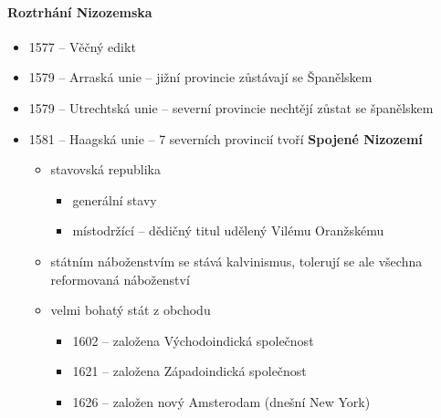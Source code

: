 \begin{itemize}
\paragraph{Roztrhání Nizozemska}
\begin{itemize}
\item 1577 -- Věčný edikt
\item 1579 -- Arraská unie -- jižní provincie zůstávají se Španělskem
\item 1579 -- Utrechtská unie -- severní provincie nechtějí zůstat se španělskem
\item 1581 -- Haagská unie -- 7 severních provincií tvoří \textbf{Spojené Nizozemí}
	\begin{itemize}
	\item stavovská republika 
		\begin{itemize}
		\item generální stavy
		\item místodržící -- dědičný titul udělený Vilému Oranžskému
		\end{itemize}
	\item státním náboženstvím se stává kalvinismus, tolerují se ale všechna reformovaná náboženství
	\item velmi bohatý stát z obchodu
		\begin{itemize}
		\item 1602 -- založena Východoindická společnost
		\item 1621 -- založena Západoindická společnost
		\item 1626 -- založen nový Amsterodam (dnešní New York)
		\end{itemize}
	\end{itemize}
\end{itemize}
\end{itemize}


\timeline
